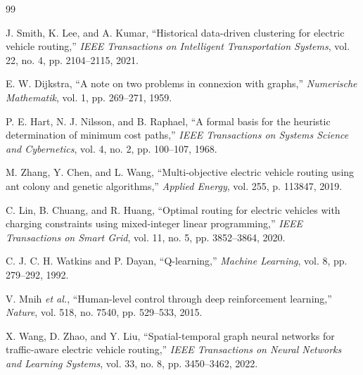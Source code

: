\documentclass[journal, a4paper, twocolumn]{IEEEtran}
\begin{document}
\begin{thebibliography}{99}

J. Smith, K. Lee, and A. Kumar, ``Historical data-driven clustering for electric vehicle routing,'' \emph{IEEE Transactions on Intelligent Transportation Systems}, vol. 22, no. 4, pp. 2104--2115, 2021.

E. W. Dijkstra, ``A note on two problems in connexion with graphs,'' \emph{Numerische Mathematik}, vol. 1, pp. 269--271, 1959.

P. E. Hart, N. J. Nilsson, and B. Raphael, ``A formal basis for the heuristic determination of minimum cost paths,'' \emph{IEEE Transactions on Systems Science and Cybernetics}, vol. 4, no. 2, pp. 100--107, 1968.

M. Zhang, Y. Chen, and L. Wang, ``Multi-objective electric vehicle routing using ant colony and genetic algorithms,'' \emph{Applied Energy}, vol. 255, p. 113847, 2019.

C. Lin, B. Chuang, and R. Huang, ``Optimal routing for electric vehicles with charging constraints using mixed-integer linear programming,'' \emph{IEEE Transactions on Smart Grid}, vol. 11, no. 5, pp. 3852--3864, 2020.

C. J. C. H. Watkins and P. Dayan, ``Q-learning,'' \emph{Machine Learning}, vol. 8, pp. 279--292, 1992.

V. Mnih \emph{et al.}, ``Human-level control through deep reinforcement learning,'' \emph{Nature}, vol. 518, no. 7540, pp. 529--533, 2015.

X. Wang, D. Zhao, and Y. Liu, ``Spatial-temporal graph neural networks for traffic-aware electric vehicle routing,'' \emph{IEEE Transactions on Neural Networks and Learning Systems}, vol. 33, no. 8, pp. 3450--3462, 2022.

\end{thebibliography}
\end{document}
